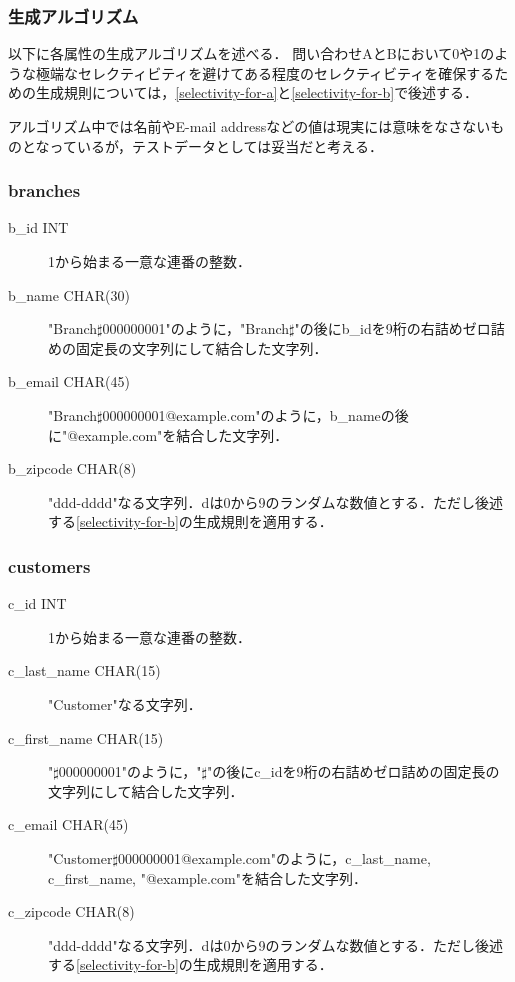 \documentclass{jsarticle}
\begin{document}
\subsubsection{生成アルゴリズム}
以下に各属性の生成アルゴリズムを述べる．
問い合わせAとBにおいて0や1のような極端なセレクティビティを避けてある程度のセレクティビティを確保するための生成規則については，\ref{selectivity-for-a}と\ref{selectivity-for-b}で後述する．

アルゴリズム中では名前やE-mail addressなどの値は現実には意味をなさないものとなっているが，テストデータとしては妥当だと考える．

\subsubsection*{branches}
\begin{description}
  \item[b\_id INT] 1から始まる一意な連番の整数．
  \item[b\_name CHAR(30)] "Branch$\sharp$000000001"のように，"Branch$\sharp$"の後にb\_idを9桁の右詰めゼロ詰めの固定長の文字列にして結合した文字列．
  \item[b\_email CHAR(45)] "Branch$\sharp$000000001@example.com"のように，b\_nameの後に"@example.com"を結合した文字列．
  \item[b\_zipcode CHAR(8)] "ddd-dddd"なる文字列．dは0から9のランダムな数値とする．ただし後述する\ref{selectivity-for-b}の生成規則を適用する．
\end{description}

\subsubsection*{customers}
\begin{description}
  \item[c\_id INT] 1から始まる一意な連番の整数．
  \item[c\_last\_name CHAR(15)] "Customer"なる文字列．
  \item[c\_first\_name CHAR(15)] "$\sharp$000000001"のように，"$\sharp$"の後にc\_idを9桁の右詰めゼロ詰めの固定長の文字列にして結合した文字列．
  \item[c\_email CHAR(45)] "Customer$\sharp$000000001@example.com"のように，c\_last\_name, c\_first\_name, "@example.com"を結合した文字列．
  \item[c\_zipcode CHAR(8)] "ddd-dddd"なる文字列．dは0から9のランダムな数値とする．ただし後述する\ref{selectivity-for-b}の生成規則を適用する．
\end{description}
\end{document}
